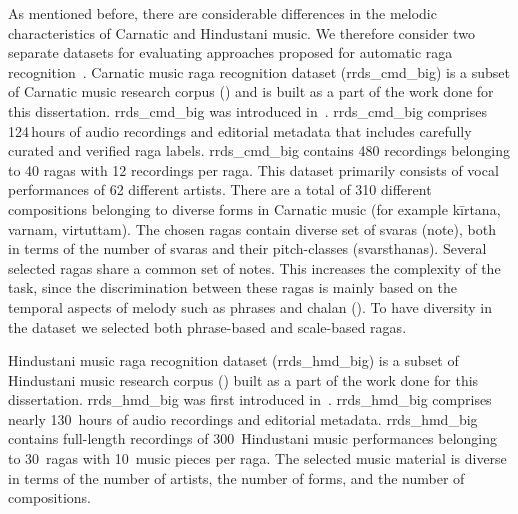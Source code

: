 {{{{As mentioned before, there are considerable differences in the melodic characteristics of Carnatic and Hindustani music. We therefore consider two separate datasets for evaluating approaches proposed for automatic \gls{raga} recognition~. Carnatic music \gls{raga} recognition dataset (\acrshort{rrds_cmd_big}) is a subset of Carnatic music research corpus () and is built as a part of the work done for this dissertation. \acrshort{rrds_cmd_big} was introduced in~\cite{gulatiphrase_2016}. \acrshort{rrds_cmd_big} comprises 124\,hours of audio recordings and editorial metadata that includes carefully curated and verified \gls{raga} labels. \acrshort{rrds_cmd_big} contains 480 recordings belonging to 40 \glspl{raga} with 12 recordings per \gls{raga}. This dataset primarily consists of vocal performances of 62 different artists. There are a total of 310 different compositions belonging to diverse forms in Carnatic music (for example k\={i}rtana, varnam, virtuttam). The chosen \glspl{raga} contain diverse set of \glspl{svara} (note), both in terms of the number of \glspl{svara} and their pitch-classes (\glspl{svarsthana}). Several selected \glspl{raga} share a common set of notes. This increases the complexity of the task, since the discrimination between these \glspl{raga} is mainly based on the temporal aspects of melody such as phrases and \gls{chalan} (). To have diversity in the dataset we selected both phrase-based and scale-based \glspl{raga}.%

Hindustani music \gls{raga} recognition dataset (\acrshort{rrds_hmd_big}) is a subset of Hindustani music research corpus () built as a part of the work done for this dissertation. \acrshort{rrds_hmd_big} was first introduced in~\cite{gulati_tdms_2016}. \acrshort{rrds_hmd_big} comprises nearly 130\, hours of audio recordings and editorial metadata. \acrshort{rrds_hmd_big} contains full-length recordings of 300~Hindustani music performances belonging to 30~\glspl{raga} with 10~music pieces per \gls{raga}. The selected music material is diverse in terms of the number of artists, the number of forms, and the number of compositions. 

}}}}
